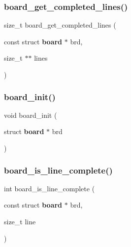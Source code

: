\mbox{\label{board_8h_a7e412d165de7cbf6c668a1e8202bb15a}} 
\subsubsection{board\+\_\+get\+\_\+completed\+\_\+lines()}
{\footnotesize\ttfamily size\+\_\+t board\+\_\+get\+\_\+completed\+\_\+lines (\begin{DoxyParamCaption}\item[{const struct \textbf{ board} $\ast$}]{brd,  }\item[{size\+\_\+t $\ast$$\ast$}]{lines }\end{DoxyParamCaption})\hspace{0.3cm}{\ttfamily [inline]}}

\mbox{\label{board_8h_ad0ed1aa92b6d55bfcf82c5ffa2306c8c}} 
\subsubsection{board\+\_\+init()}
{\footnotesize\ttfamily void board\+\_\+init (\begin{DoxyParamCaption}\item[{struct \textbf{ board} $\ast$}]{brd }\end{DoxyParamCaption})\hspace{0.3cm}{\ttfamily [inline]}}

\mbox{\label{board_8h_a6660f858472cab9be47a59241f4d20b3}} 
\subsubsection{board\+\_\+is\+\_\+line\+\_\+complete()}
{\footnotesize\ttfamily int board\+\_\+is\+\_\+line\+\_\+complete (\begin{DoxyParamCaption}\item[{const struct \textbf{ board} $\ast$}]{brd,  }\item[{size\+\_\+t}]{line }\end{DoxyParamCaption})\hspace{0.3cm}{\ttfamily [inline]}}

